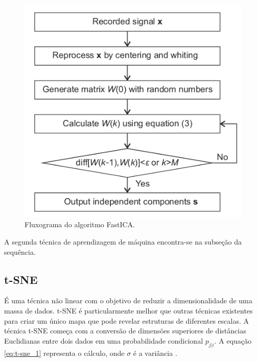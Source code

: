 \begin{figure}[H]
    \caption{Fluxograma do algoritmo FastICA.}
    \begin{center}
        \includegraphics[scale=.5]{referencial/img/fatica_fang_p3.png}
    \end{center}
    \label{fig:fatica_fang_p3}
\end{figure}

A segunda técnica de aprendizagem de máquina encontra-se na subseção da sequência.


% 

\subsection{t-SNE}

É uma técnica não linear com o objetivo de reduzir a dimensionalidade de uma massa de dados. t-SNE é particularmente melhor que 
outras técnicas existentes para criar um único mapa que pode revelar estruturas de diferentes escalas. A técnica t-SNE começa com a 
conversão de dimensões superiores de distâncias Euclidianas entre dois dados em uma probabilidade condicional
$p_{j|i}$. A equação \ref{eq:t-sne_1} representa o cálculo, onde $\sigma$ é a variância \cite{VanDerMaaten2008}.

